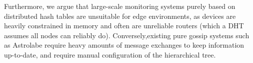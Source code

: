 Furthermore, we argue that large-scale monitoring systems purely based on distributed hash tables \cite{SDIMS} are unsuitable for edge environments, as  devices are heavily constrained in memory and often are unreliable routers (which a DHT assumes all nodes can reliably do).  Conversely,existing pure gossip systems such as Astrolabe \cite{Renesse2003} require heavy amounts of message exchanges to keep information up-to-date, and require manual configuration of the hierarchical tree.















    
    
